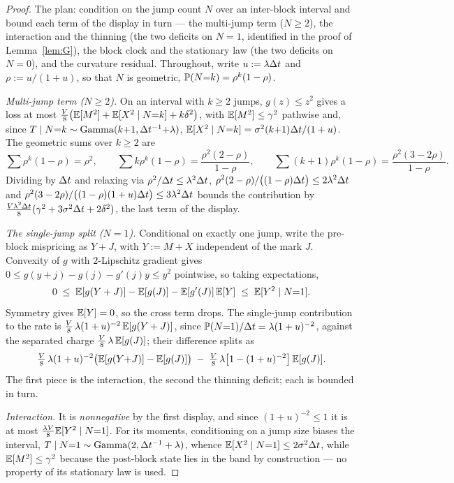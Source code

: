 \begin{proof}
The plan: condition on the jump count $N$ over an inter-block interval and bound each term of the display in turn --- the multi-jump term ($N\ge2$), the interaction and the thinning (the two deficits on $N=1$, identified in the proof of Lemma~\ref{lem:G}), the block clock and the stationary law (the two deficits on $N=0$), and the curvature residual. Throughout, write $u:=\lambda\Delta t$ and $\rho:=u/(1+u)$, so that $N$ is geometric, $\mathbb{P}(N{=}k)=\rho^k(1-\rho)$.

\emph{Multi-jump term ($N\ge2$).} On an interval with $k\ge2$ jumps, $g(z)\le z^2$ gives a loss at most $\tfrac{V}{8}\big(\mathbb{E}[M^2]+\mathbb{E}[X^2\mid N{=}k]+k\delta^2\big)$, with $\mathbb{E}[M^2]\le\gamma^2$ pathwise and, since $T\mid N{=}k\sim\mathrm{Gamma}(k{+}1,\Delta t^{-1}{+}\lambda)$, $\mathbb{E}[X^2\mid N{=}k]=\sigma^2(k{+}1)\Delta t/(1+u)$. The geometric sums over $k\ge2$ are
\[
\textstyle\sum\rho^k(1-\rho)=\rho^2, \qquad
\textstyle\sum k\rho^k(1-\rho)=\frac{\rho^2(2-\rho)}{1-\rho}, \qquad
\textstyle\sum (k{+}1)\rho^k(1-\rho)=\frac{\rho^2(3-2\rho)}{1-\rho}.
\]
Dividing by $\Delta t$ and relaxing via $\rho^2/\Delta t\le\lambda^2\Delta t$, $\rho^2(2-\rho)/\big((1-\rho)\Delta t\big)\le2\lambda^2\Delta t$ and $\rho^2(3-2\rho)/\big((1-\rho)(1+u)\Delta t\big)\le3\lambda^2\Delta t$ bounds the contribution by $\tfrac{V\lambda^2\Delta t}{8}(\gamma^2+3\sigma^2\Delta t+2\delta^2)$, the last term of the display.

\emph{The single-jump split ($N=1$).} Conditional on exactly one jump, write the pre-block mispricing as $Y+J$, with $Y := M+X$ independent of the mark $J$. Convexity of $g$ with $2$-Lipschitz gradient gives $0\le g(y+j)-g(j)-g'(j)y\le y^2$ pointwise, so taking expectations,
\[
0 \;\le\; \mathbb{E}[g(Y+J)]-\mathbb{E}[g(J)] - \mathbb{E}[g'(J)]\,\mathbb{E}[Y] \;\le\; \mathbb{E}[Y^2\mid N{=}1].
\]
Symmetry gives $\mathbb{E}[Y]=0$, so the cross term drops. The single-jump contribution to the rate is $\tfrac{V}{8}\,\lambda(1+u)^{-2}\,\mathbb{E}[g(Y+J)]$, since $\mathbb{P}(N{=}1)/\Delta t=\lambda(1+u)^{-2}$, against the separated charge $\tfrac{V}{8}\,\lambda\,\mathbb{E}[g(J)]$; their difference splits as
\[
\tfrac{V}{8}\,\lambda(1+u)^{-2}\big(\mathbb{E}[g(Y{+}J)]-\mathbb{E}[g(J)]\big) \;-\; \tfrac{V}{8}\,\lambda\big[1-(1+u)^{-2}\big]\,\mathbb{E}[g(J)].
\]
The first piece is the interaction, the second the thinning deficit; each is bounded in turn.

\emph{Interaction.} It is \emph{nonnegative} by the first display, and since $(1+u)^{-2}\le1$ it is at most $\tfrac{\lambda V}{8}\mathbb{E}[Y^2\mid N{=}1]$. For its moments, conditioning on a jump size biases the interval, $T\mid N{=}1\sim\mathrm{Gamma}(2,\Delta t^{-1}+\lambda)$, whence $\mathbb{E}[X^2\mid N{=}1]\le2\sigma^2\Delta t$, while $\mathbb{E}[M^2]\le\gamma^2$ because the post-block state lies in the band by construction --- no property of its stationary law is used.


\end{proof}
